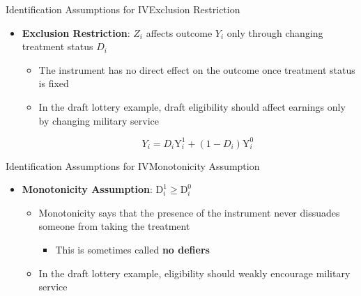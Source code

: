 \documentclass[dvipsnames,hyperref={pdfpagelabels=false}]{beamer}
\begin{document}
\begin{frame}{Identification Assumptions for IV}{Exclusion Restriction}
	\begin{itemize}
		
		
		\item \textbf{Exclusion Restriction}: $Z_{i}$ affects outcome $Y_{i}$ only through changing treatment status $D_{i}$
		\vspace{0.2cm}
		\begin{itemize}	
			\item The instrument has no direct effect on the outcome once treatment status is fixed
			\vspace{0.2cm}
			\item In the draft lottery example, draft eligibility should affect earnings only by changing military service
		
			\begin{equation*}
				Y_i = D_i \mathrm{Y}^{1}_{i}+(1-D_i)\mathrm{Y}^{0}_{i}
			\end{equation*}
		
		
			\end{itemize}
		
	\end{itemize}
\end{frame}




\begin{frame}{Identification Assumptions for IV}{Monotonicity Assumption}
	\begin{itemize}
		
		
	
		
		\item \textbf{Monotonicity Assumption}: $\mathrm{D}^{1}_{i} \geq \mathrm{D}^{0}_{i}$
		\vspace{0.2cm}
		\vspace{0.2cm}
			\begin{itemize}
		\item Monotonicity says that the presence of the instrument never dissuades someone from taking the treatment
		\vspace{0.2cm}
		\begin{itemize}
			\item This is sometimes called \textbf{no defiers}
		\end{itemize}
		\vspace{0.2cm}
		\item In the draft lottery example, eligibility should weakly encourage military service
			\end{itemize}
		
	\end{itemize}
\end{frame}
\end{document}
